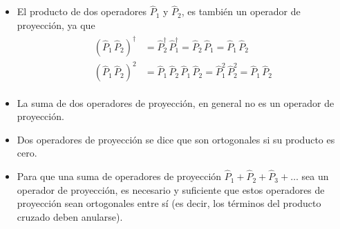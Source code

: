 \begin{itemize}
\item El producto de dos operadores $\hat{P}_{1}$ y $\hat{P}_{2}$, es también un operador de proyección, ya que
\begin{align}
\begin{aligned}
(\hat{P}_{1} \, \hat{P}_{2})^{\dagger} &= \hat{P}_{2}^{\dagger} \, \hat{P}_{1}^{\dagger} = \hat{P}_{2} \, \hat{P}_{1} =  \hat{P}_{1} \, \hat{P}_{2} \\
(\hat{P}_{1} \, \hat{P}_{2})^{2} &= \hat{P}_{1} \, \hat{P}_{2} \, \hat{P}_{1} \, \hat{P}_{2} = \hat{P}_{1}^{2} \, \hat{P}_{2}^{2} = \hat{P}_{1} \, \hat{P}_{2}
\end{aligned}
\label{eq:ecuacion_02_77}
\end{align}
\item La suma de dos operadores de proyección, en general no es un operador de proyección.
\item Dos operadores de proyección se dice que son ortogonales si su producto es cero.
\item Para que una suma de operadores de proyección $\hat{P}_{1} + \hat{P}_{2} + \hat{P}_{3} + \ldots$ sea un operador de proyección, es necesario y suficiente que estos operadores de proyección sean ortogonales entre sí (es decir, los términos del producto cruzado deben anularse).
\end{itemize}
